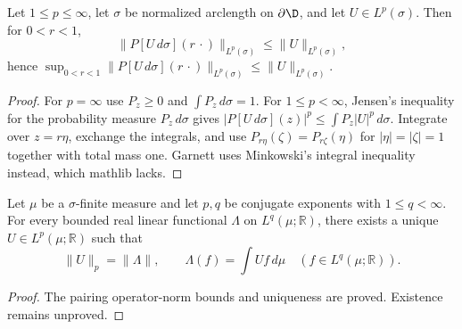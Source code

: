 \begin{lemma}
  \label{eq:I_3_5}
  \leanok
  Let $1\le p\le\infty$, let $\sigma$ be normalized arclength on $\partial\D$,
  and let $U\in L^p(\sigma)$. Then for $0<r<1$,
  \[
    \|P[U\,d\sigma](r\,\cdot)\|_{L^p(\sigma)}\le\|U\|_{L^p(\sigma)},
  \]
  hence $\sup_{0<r<1}\|P[U\,d\sigma](r\,\cdot)\|_{L^p(\sigma)}
  \le\|U\|_{L^p(\sigma)}$.
  \begin{proof}
    \leanok
    For $p=\infty$ use $P_z\ge0$ and $\int P_z\,d\sigma=1$. For
    $1\le p<\infty$, Jensen's inequality for the probability measure
    $P_z\,d\sigma$ gives $|P[U\,d\sigma](z)|^p\le\int P_z|U|^p\,d\sigma$.
    Integrate over $z=r\eta$, exchange the integrals, and use
    $P_{r\eta}(\zeta)=P_{r\zeta}(\eta)$ for $|\eta|=|\zeta|=1$ together with
    total mass one. Garnett uses Minkowski's integral inequality instead,
    which mathlib lacks.
  \end{proof}
\end{lemma}

\begin{theorem}
  \label{thm:lp_duality}
  \leanok
  Let $\mu$ be a $\sigma$-finite measure and let $p,q$ be conjugate exponents with
  $1\le q<\infty$. For every bounded real linear functional
  $\Lambda$ on $L^q(\mu;\mathbb R)$, there exists a unique $U\in L^p(\mu;\mathbb R)$ such that
  \[
    \|U\|_p=\|\Lambda\|,
    \qquad \Lambda(f)=\int Uf\,d\mu\quad(f\in L^q(\mu;\mathbb R)).
  \]
  \begin{proof}
    \notready
    The pairing operator-norm bounds and uniqueness are proved. Existence remains unproved.
  \end{proof}
\end{theorem}

